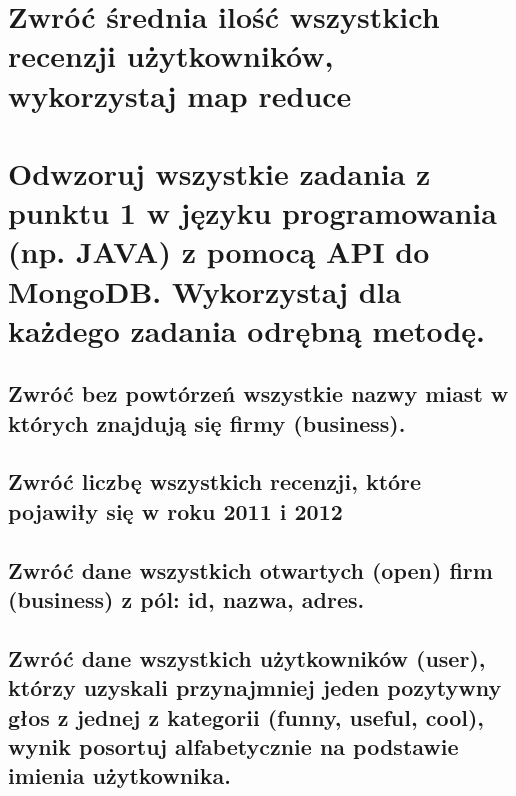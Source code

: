 \documentclass[a4paper, 11pt]{article}
\begin{document}
    \newpage

    \section{Zwróć średnia ilość wszystkich recenzji użytkowników, wykorzystaj map reduce}

    


    \newpage

    \section{Odwzoruj wszystkie zadania z punktu 1 w języku programowania (np. JAVA) z pomocą
    API do MongoDB. Wykorzystaj dla każdego zadania odrębną metodę. }

    \subsection{Zwróć bez powtórzeń wszystkie nazwy miast w których znajdują się firmy
    (business). }

    

    \subsection{Zwróć liczbę wszystkich recenzji, które pojawiły się w roku 2011 i 2012}

    


    \subsection{Zwróć dane wszystkich otwartych (open) firm (business) z pól: id, nazwa, adres.}

    

    \newpage

    \subsection{Zwróć dane wszystkich użytkowników (user), którzy uzyskali przynajmniej jeden
    pozytywny głos z jednej z kategorii (funny, useful, cool), wynik posortuj
    alfabetycznie na podstawie imienia użytkownika.}
\end{document}
